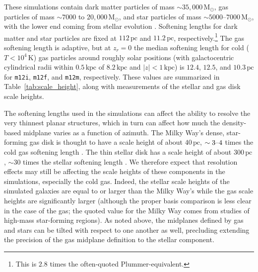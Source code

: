 \documentclass[twocolumn]{aastex62}
\newcommand{\Msun}{\ensuremath{\text{M}_\odot}}
\newcommand{\pc}{\text{pc}}
\newcommand{\kpc}{\text{kpc}}
\newcommand{\mi}{\texttt{m12i}}
\newcommand{\mf}{\texttt{m12f}}
\newcommand{\mm}{\texttt{m12m}}
\newcommand{\abs}[1]{\left| #1 \right|}
\newcommand{\z}{z_r}
\begin{document}
These simulations contain dark matter particles of mass $\sim35,000\,\Msun$,
gas particles of mass $\sim 7000$ to $20,000\,\Msun$, and star particles of
mass $\sim 5000 \text{--} 7000\, \Msun$, with the lower end coming from
stellar evolution \citep{2018arXiv180610564S}. Softening lengths for dark
matter and star particles are fixed at $112\,\pc$ and $11.2\,\pc$,
respectively.\footnote{This is $2.8$ times the often-quoted
Plummer-equivalent.} The gas softening length is adaptive, but at $\z=0$ the
median softening length for cold ($T < 10^4\,\text{K}$) gas particles around
roughly solar positions (with galactocentric cylindrical radii within
$0.5\,\kpc$ of $8.2\,\kpc$ and $\abs{z}<1\,\kpc$) is $12.4$, $12.5$, and
$10.3\,\pc$ for \mi{}, \mf{}, and \mm{}, respectively. These values are
summarized in Table~\ref{tab:scale_height}, along with measurements of the
stellar and gas disk scale heights.

The softening lengths used in the simulations can affect the ability to
resolve the very thinnest planar structures, which in turn can affect how much
the density-based midplane varies as a function of azimuth. The Milky Way's
dense, star-forming gas disk is thought to have a scale height of about
$40\,\pc$, $\sim3\textup{--}4$ times the cold gas softening length
\citep{2019ApJ...871..145A}. The thin stellar disk has a scale height of about
$300\,\pc$, $\sim30$ times the stellar softening length
\citep{2008ApJ...673..864J}. We therefore expect that resolution effects may
still be affecting the scale heights of these components in the simulations,
especially the cold gas. Indeed, the stellar scale heights of the simulated
galaxies are equal to or larger than the Milky Way's while the gas scale
heights are significantly larger (although the proper basis comparison is less
clear in the case of the gas; the quoted value for the Milky Way comes from
studies of high-mass star-forming regions). As noted above, the midplanes
defined by gas and stars can be tilted with respect to one another as well,
precluding extending the precision of the gas midplane definition to the
stellar component.
\end{document}

